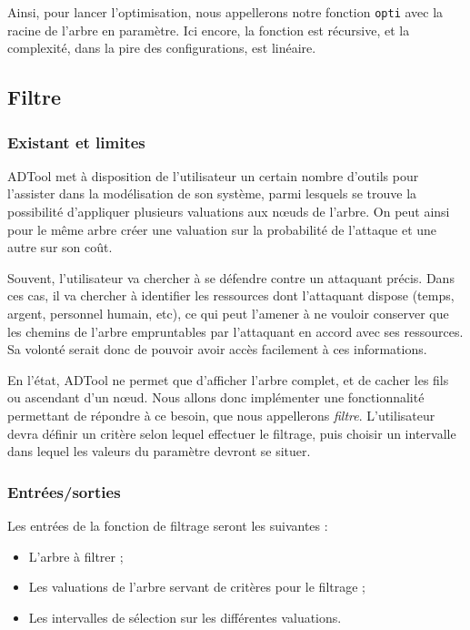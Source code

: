 		Ainsi, pour lancer l'optimisation, nous appellerons notre fonction \verb|opti| avec la racine de l'arbre en paramètre.
		Ici encore, la fonction est récursive, et la complexité, dans la pire des configurations, est linéaire.

	\subsection{Filtre}
	\label{subsection:filtre} 
			\subsubsection{Existant et limites}
		ADTool met à disposition de l'utilisateur un certain nombre d'outils pour l'assister dans la modélisation de son système, parmi lesquels se trouve la possibilité d'appliquer plusieurs valuations aux nœuds de l'arbre. On peut ainsi pour le même arbre créer une valuation sur la probabilité de l'attaque et une autre sur son coût.

		Souvent, l'utilisateur va chercher à se défendre contre un attaquant précis. Dans ces cas, il va chercher à identifier les ressources dont l'attaquant dispose (temps, argent, personnel humain, etc), ce qui peut l'amener à ne vouloir conserver que les chemins de l'arbre empruntables par l'attaquant en accord avec ses ressources. Sa volonté serait donc de pouvoir avoir accès facilement à ces informations.

		En l'état, ADTool ne permet que d'afficher l'arbre complet, et de cacher les fils ou ascendant d'un nœud. Nous allons donc implémenter une fonctionnalité permettant de répondre à ce besoin, que nous appellerons \textit{filtre}. L’utilisateur devra définir un critère selon lequel effectuer le filtrage, puis choisir un intervalle dans lequel les valeurs du paramètre devront se situer.
			
			\subsubsection{Entrées/sorties}

		Les entrées de la fonction de filtrage seront les suivantes :
		\begin{itemize}
			\item L'arbre à filtrer ;
			\item Les valuations de l'arbre servant de critères pour le filtrage ;
			\item Les intervalles de sélection sur les différentes valuations.
		\end{itemize} %
		
